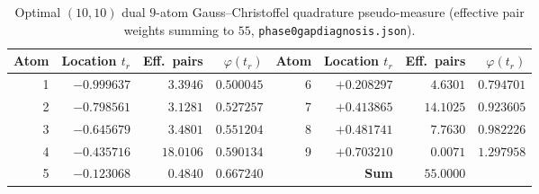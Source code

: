 \documentclass[11pt,reqno]{amsart}
\renewcommand{\_}{\origunderscore\allowbreak}
\theoremstyle{definition}
\begin{document}
\begin{table}[htbp]
  \centering
  \caption{Optimal $(10,10)$ dual $9$-atom Gauss--Christoffel quadrature pseudo-measure (effective pair weights summing to $55$, \texttt{phase0\_gap\_diagnosis.json}).}
  \label{tab:atoms}
  \footnotesize
  \renewcommand{\arraystretch}{1.06}
  \begin{tabular}{@{}rrrr@{\qquad}rrrr@{}}
    \toprule
    Atom & Location $t_r$ & Eff.\ pairs & $\varphi(t_r)$ & Atom & Location $t_r$ & Eff.\ pairs & $\varphi(t_r)$ \\
    \midrule
    1 & $-0.999637$ & $\mathbf{3.3946}$ & $0.500045$ & 6 & $+0.208297$ & $4.6301$ & $0.794701$ \\
    2 & $-0.798561$ & $3.1281$ & $0.527257$ & 7 & $+0.413865$ & $\mathbf{14.1025}$ & $0.923605$ \\
    3 & $-0.645679$ & $3.4801$ & $0.551204$ & 8 & $+0.481741$ & $\mathbf{7.7630}$ & $0.982226$ \\
    4 & $-0.435716$ & $\mathbf{18.0106}$ & $0.590134$ & 9 & $+0.703210$ & $0.0071$ & $1.297958$ \\
    5 & $-0.123068$ & $0.4840$ & $0.667240$ & & \textbf{Sum} & $\mathbf{55.0000}$ & \\
    \bottomrule
  \end{tabular}
\end{table}
\end{document}
